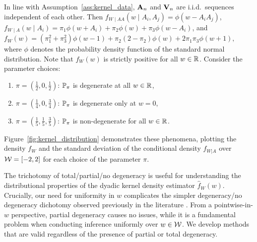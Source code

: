 In line with Assumption~\ref{ass:kernel_data}, $\bA_n$ and $\bV_n$ are i.i.d.\
sequences independent of each other. Then
$f_{W \mid AA}(w \mid A_i, A_j) = \phi(w - A_i A_j)$,\,
$f_{W \mid A}(w \mid A_i) = \pi_1 \phi(w + A_i) + \pi_2 \phi(w)
+ \pi_3 \phi(w - A_i)$, and
$f_W(w) = (\pi_1^2 + \pi_3^2) \phi(w-1) + \pi_2 (2 - \pi_2) \phi(w) + 2
\pi_1 \pi_3 \phi(w+1),$
where $\phi$ denotes the probability density function of the standard normal
distribution. Note that $f_W(w)$ is strictly positive for all $w \in \R$.
Consider the parameter choices:
%
\begin{enumerate}[label=(\roman*)]

  \item $\pi = \left( \frac{1}{2}, 0, \frac{1}{2} \right)$:\quad
    $\P_\pi$ is degenerate at all $w \in \R$,

  \item $\pi = \left( \frac{1}{4}, 0, \frac{3}{4} \right)$:\quad
    $\P_\pi$ is degenerate only at $w=0$,

  \item $\pi = \left( \frac{1}{5}, \frac{1}{5}, \frac{3}{5} \right)$:\quad
    $\P_\pi$ is non-degenerate for all $w \in \R$.

\end{enumerate}
%
Figure~\ref{fig:kernel_distribution} demonstrates these phenomena, plotting the
density $f_W$ and the standard deviation of the conditional
density $f_{W|A}$ over $\cW = [-2,2]$ for each choice of the parameter $\pi$.

The trichotomy of total/partial/no  degeneracy is useful for understanding the
distributional properties of the dyadic kernel density estimator
$\hat{f}_W(w)$. Crucially, our need for uniformity in $w$ complicates the
simpler degeneracy/no degeneracy dichotomy observed previously in the
literature \citep{graham2024kernel}. From a pointwise-in-$w$
perspective, partial degeneracy causes no issues, while it is a fundamental
problem when conducting inference uniformly over $w \in \cW$. We develop
methods that are valid regardless of the presence of partial or total
degeneracy.

